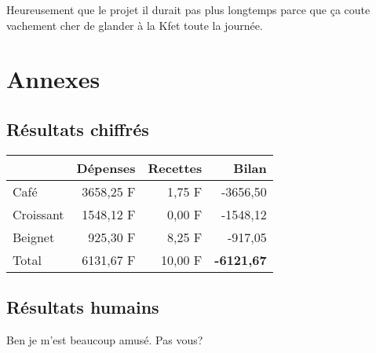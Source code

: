 \documentclass[french,12pt, a4paper,twoside,openright]{report}
\begin{document}
Heureusement que le projet il durait pas plus longtemps parce que \c{c}a coute
vachement cher de glander \`a la Kfet toute la journ\'ee.

\part{Annexes}

\appendix

\chapter{R\'esultats chiffr\'es}

\begin{tabular}{|l|r|r|r|}                                        \hline
                      & D\'epenses     & Recettes   & Bilan    \\ \hline
Caf\'e                & 3658,25 F      & 1,75 F     & -3656,50 \\ \hline
Croissant             & 1548,12 F      & 0,00 F     & -1548,12 \\ \hline
Beignet               &  925,30 F      & 8,25 F     &  -917,05 \\ \hline
                                                                  \hline
Total                 & 6131,67 F      & 10,00 F    & \textbf{-6121,67} \\ \hline
\end{tabular}

\chapter{R\'esultats humains}

Ben je m'est beaucoup amus\'e. Pas vous?
\end{document}
